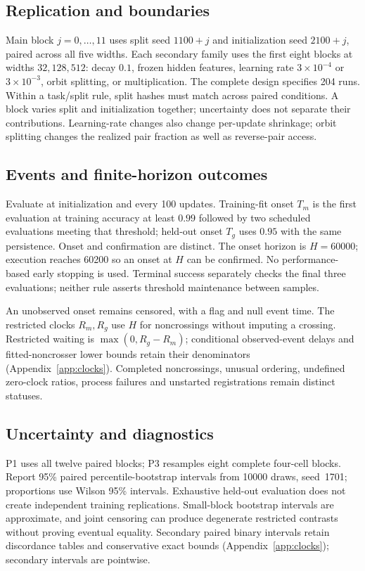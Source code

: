 \subsection{Replication and boundaries}
Main block $j=0,\ldots,11$ uses split seed $1100+j$ and initialization seed $2100+j$, paired across all five widths. Each secondary family uses the first eight blocks at widths $32,128,512$: decay $0.1$, frozen hidden features, learning rate $3\times10^{-4}$ or $3\times10^{-3}$, orbit splitting, or multiplication. The complete design specifies 204 runs. Within a task/split rule, split hashes must match across paired conditions. A block varies split and initialization together; uncertainty does not separate their contributions. Learning-rate changes also change per-update shrinkage; orbit splitting changes the realized pair fraction as well as reverse-pair access.

\subsection{Events and finite-horizon outcomes}
\label{sec:events}
Evaluate at initialization and every 100 updates. Training-fit onset $T_m$ is the first evaluation at training accuracy at least $0.99$ followed by two scheduled evaluations meeting that threshold; held-out onset $T_g$ uses $0.95$ with the same persistence. Onset and confirmation are distinct. The onset horizon is $H=60000$; execution reaches 60200 so an onset at $H$ can be confirmed. No performance-based early stopping is used. Terminal success separately checks the final three evaluations; neither rule asserts threshold maintenance between samples.

An unobserved onset remains censored, with a flag and null event time. The restricted clocks $R_m,R_g$ use $H$ for noncrossings without imputing a crossing. Restricted waiting is $\max(0,R_g-R_m)$; conditional observed-event delays and fitted-noncrosser lower bounds retain their denominators (Appendix~\ref{app:clocks}). Completed noncrossings, unusual ordering, undefined zero-clock ratios, process failures and unstarted registrations remain distinct statuses.

\subsection{Uncertainty and diagnostics}
\label{sec:uncertainty}
P1 uses all twelve paired blocks; P3 resamples eight complete four-cell blocks. Report 95\% paired percentile-bootstrap intervals from 10000 draws, seed~1701; proportions use Wilson 95\% intervals. Exhaustive held-out evaluation does not create independent training replications. Small-block bootstrap intervals are approximate, and joint censoring can produce degenerate restricted contrasts without proving eventual equality. Secondary paired binary intervals retain discordance tables and conservative exact bounds (Appendix~\ref{app:clocks}); secondary intervals are pointwise.

